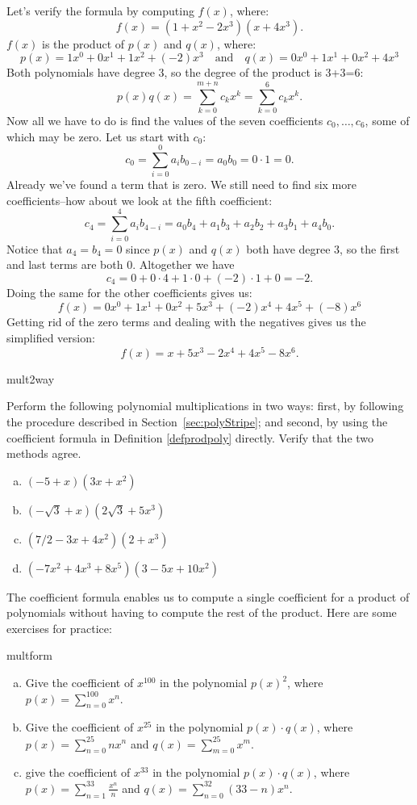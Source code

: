 Let's verify the formula by computing $f(x)$, where:
\[ f(x)=(1+x^2-2x^3)(x+4x^3). \]
$f(x)$ is the product of $p(x)$ and $q(x)$, where:
\[p(x)= 1x^0 + 0x^1 + 1x^2 + (-2)x^3  \quad \text{and} \quad q(x)= 0x^0 + 1x^1 + 0x^2 + 4x^3 \]
Both polynomials have degree 3, so the degree of the product is 3+3=6:
\[
p(x) q(x) = \sum_{k=0}^{m+n} c_k  x^k =  \sum_{k=0}^{6} c_k x^k. 
\]
Now all we have to do is find the values of the seven coefficients $c_0, \ldots,c_6$, some of which may be zero.  Let us start with $c_0$:
\[ c_0 = \sum_{i = 0}^0 a_i b_{0 - i} = a_0b_0= 0 \cdot 1 = 0. \]
Already we've found a term that is zero.  We still need to find six more coefficients--how about we look at the fifth coefficient:
\[ c_4 =  \sum_{i = 0}^4 a_i b_{4 - i} =   a_0b_4 + a_1b_3 +a_2b_2 + a_3b_1 + a_4b_0.\]
Notice that $a_4=b_4=0$ since $p(x)$ and $q(x)$ both have degree 3, so the first and last terms are both 0. Altogether we have 
\[ c_4=0+0\cdot 4+1\cdot 0+(-2)\cdot 1+0=-2.\]
Doing the same for the other coefficients gives us:
\[f(x)= 0x^0+ 1x^1 + 0x^2 + 5x^3 + (-2)x^4 + 4x^5 + (-8)x^6 \]
Getting rid of the zero terms and dealing with the negatives gives us the simplified version:
\[f(x)=x+5x^3-2x^4+4x^5-8x^6. \]
\begin{exercise}{mult2way}

Perform the following polynomial multiplications in two ways: first, by following the procedure described in Section~\ref{sec:polyStripe}; and second, by using the coefficient formula in Definition \ref{defprodpoly} directly.  Verify that the two methods agree.
\begin{enumerate}[(a)]
\item
$(-5+x)(3x+ x^2)$
\item
$(-\sqrt{3}+x)(2\sqrt{3}+5x^3)$
\item
$(7/2- 3x+4x^2)(2+x^3)$
\item
$(- 7x^2 + 4x^3+8x^5 )(3-5x+10x^2 )$
\end{enumerate}
\end {exercise}

The coefficient formula enables us to compute a single coefficient for a product of polynomials without having 
to compute the rest of the product. Here are some exercises for practice:

\begin{exercise}{multform}
\begin{enumerate}[(a)]
\item
Give the coefficient of $x^{100}$ in the polynomial $p(x)^2$, where $p(x) = \sum_{n=0}^{100} x^n$.
\item
Give the coefficient of $x^{25}$ in the polynomial $p(x) \cdot q(x)$, where $p(x) = \sum_{n=0}^{25} nx^n$  and $q(x) = \sum_{m=0}^{25} x^m$.
\item
give the coefficient of $x^{33}$ in the polynomial 
$p(x) \cdot q(x)$, where  $p(x) = \sum_{n=1}^{33} \frac{x^n}{n}$ and  $q(x) = \sum_{n=0}^{32} (33-n)x^n$.
\end{enumerate}
\end {exercise}

